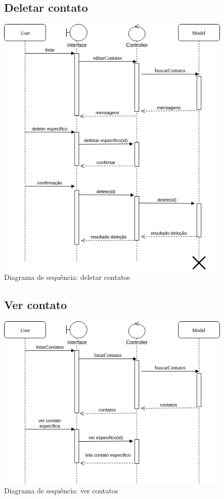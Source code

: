 \documentclass[
	12pt,				%
	openright,			%
	twoside,			%
	a4paper,			%
	english,			%
	french,				%
	spanish,			%
	brazil				%
]{abntex2}
\begin{document}
\begin{figure}
	\subsection{Deletar contato}
	\label{figure_diagrama_sequencia_deletar_contato}
	\caption{Diagrama de sequência: deletar contatos}
	\includegraphics[scale=0.6]{SequenceContatos/DeleteContatoSequence.png}
	\hfill
\end{figure}
%
\begin{figure}[h]
	\subsection{Ver contato}
	\label{figure_diagrama_sequencia_ver_contato}
	\caption{Diagrama de sequência: ver contatos}
	\includegraphics[scale=0.6]{SequenceContatos/VerContatos.png}
	\hfill
\end{figure}
\end{document}
